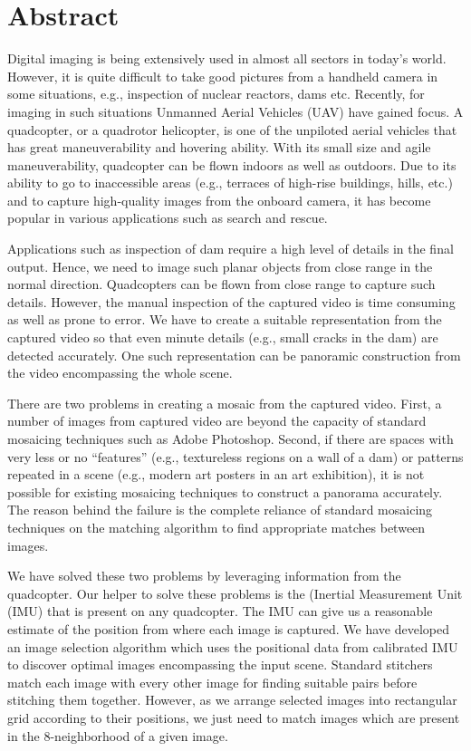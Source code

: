 \chapter*{Abstract}
\thispagestyle{empty}
Digital imaging is being extensively used in almost all sectors in today's
world. However, it is quite difficult to take good pictures from a handheld
camera in some situations, e.g., inspection of nuclear reactors, dams etc. Recently, 
for imaging in such situations Unmanned Aerial Vehicles (UAV) have gained focus. A
quadcopter, or a quadrotor helicopter, is one of the unpiloted aerial vehicles
that has great maneuverability and hovering ability. With its small size and
agile maneuverability, quadcopter can be flown indoors as well as
outdoors. Due to its ability to go to inaccessible areas (e.g., terraces of
high-rise buildings, hills, etc.) and to capture high-quality images from the
onboard camera, it has become popular in various applications such as search and
rescue.

Applications such as inspection of dam require a high level of details in the
final output. Hence, we need to image such planar objects from close range in
the normal direction. Quadcopters can be flown from close range to capture such
details. However, the manual inspection of the captured video is time consuming
as well as prone to error. We have to create a suitable representation from the
captured video so that even minute details (e.g., small cracks in the dam) are
detected accurately. One such representation can be panoramic construction from
the video encompassing the whole scene. 

There are two problems in creating a mosaic from the captured video. First,
a number of images from captured video are beyond the capacity of standard
mosaicing techniques such as Adobe Photoshop. Second, if there are spaces with very less
or no ``features'' (e.g., textureless regions on a wall of a dam) or patterns
repeated in a scene (e.g., modern art posters in an art exhibition), it is not possible for existing
mosaicing techniques to construct a panorama accurately. The reason behind 
the failure is the complete reliance of standard mosaicing techniques on the matching
algorithm to find appropriate matches between images. 

We have solved these two problems by leveraging information from the quadcopter.
Our helper to solve these problems is the (Inertial Measurement Unit (IMU) that
is present on any quadcopter. The IMU can give us a reasonable estimate of
the position from where each image is captured. We have developed an image selection
algorithm which uses the positional data from calibrated IMU to discover optimal
images encompassing the input scene. Standard stitchers match each image
with every other image for finding suitable pairs before stitching them
together. However, as we arrange selected images into rectangular grid
according to their positions, we just need to match images which are present in
the 8-neighborhood of a given image.

